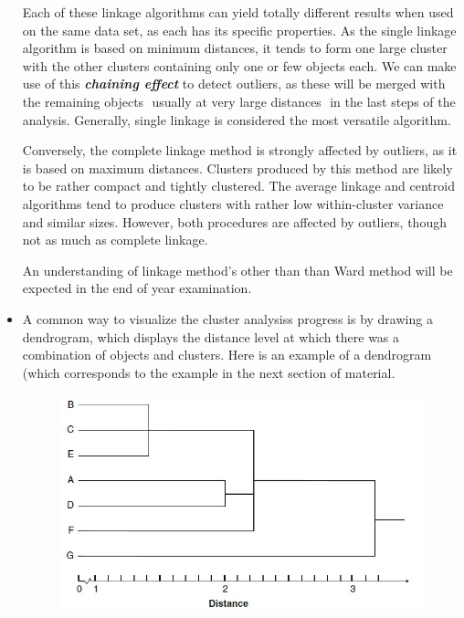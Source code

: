 \documentclass[a4paper,12pt]{article}
\begin{document}
\begin{itemize}
\begin{description}
\begin{figure}[h!]
\begin{center}
		\end{center}
	\end{figure}
\end{description}
Each of these linkage algorithms can yield totally different results when used on the same data set, as each has its specific properties. As the single linkage algorithm is based on minimum distances, it tends to form one large cluster with the other clusters containing only one or few objects each. We can make use of this \textbf{\textit{chaining effect}} to detect outliers, as these will be merged with the remaining objects  usually at very large distances  in the last steps of the analysis. Generally, single linkage is considered the most versatile algorithm.

Conversely, the complete linkage method is strongly affected by outliers, as it is based on maximum distances. Clusters produced by this method are likely to be rather compact and tightly clustered. The average linkage and centroid algorithms tend to produce clusters with rather low within-cluster variance and similar sizes.
However, both procedures are affected by outliers, though not as much as complete linkage.

An understanding of linkage method's other than than Ward method will be expected in the end of year examination.

\item A common way to visualize the cluster analysiss progress is by drawing a
dendrogram, which displays the distance level at which there was a combination
of objects and clusters.
Here is an example of a dendrogram (which corresponds to the example in the next section of material.


\begin{figure}[h!]
	\begin{center}
		\includegraphics[scale=0.6]{images/Dendrogram.jpg}\\
	\end{center}
\end{figure}


\end{itemize}
\end{document}
